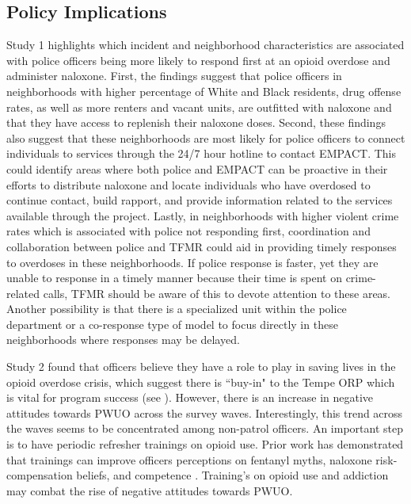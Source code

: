 \subsection{Policy Implications}
Study 1 highlights which incident and neighborhood characteristics are associated with police officers being more likely to respond first at an opioid overdose and administer naloxone. First, the findings suggest that police officers in neighborhoods with higher percentage of White and Black residents, drug offense rates, as well as more renters and vacant units, are outfitted with naloxone and that they have access to replenish their naloxone doses. Second, these findings also suggest that these neighborhoods are most likely for police officers to connect individuals to services through the 24/7 hour hotline to contact EMPACT. This could identify areas where both police and EMPACT can be proactive in their efforts to distribute naloxone and locate individuals who have overdosed to continue contact, build rapport, and provide information related to the services available through the project. Lastly, in neighborhoods with higher violent crime rates which is associated with police not responding first, coordination and collaboration between police and TFMR could aid in providing timely responses to overdoses in these neighborhoods. If police response is faster, yet they are unable to response in a timely manner because their time is spent on crime-related calls, TFMR should be aware of this to devote attention to these areas. Another possibility is that there is a specialized unit within the police department or a co-response type of model to focus directly in these neighborhoods where responses may be delayed. 

Study 2 found that officers believe they have a role to play in saving lives in the opioid overdose crisis, which suggest there is ``buy-in" to the Tempe ORP which is vital for program success (see \cite{winstanley_bell_2020}). However, there is an increase in negative attitudes towards PWUO across the survey waves. Interestingly, this trend across the waves seems to be concentrated among non-patrol officers. An important step is to have periodic refresher trainings on opioid use. Prior work has demonstrated that trainings can improve officers perceptions on fentanyl myths, naloxone risk-compensation beliefs, and competence \parencite{del_pozo_can_2021, wagner_training_2016, white_narcan_2021, winograd_concerns_2019}. Training's on opioid use and addiction may combat the rise of negative attitudes towards PWUO.


